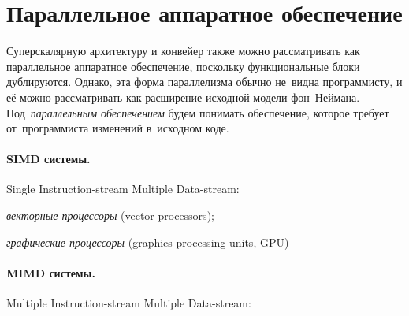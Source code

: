 \section{Параллельное аппаратное обеспечение}
Суперскалярную архитектуру и конвейер также можно рассматривать как параллельное аппаратное обеспечение, поскольку функциональные блоки дублируются. Однако, эта форма параллелизма обычно не~видна программисту, и её можно рассматривать как расширение исходной модели фон~Неймана. Под~\emph{параллельным обеспечением} будем понимать обеспечение, которое требует от~программиста изменений в~исходном коде.



\paragraph{SIMD системы.}
\textenglish{Single Instruction-stream Multiple Data-stream}:
\begin{itemfeature}
  \item \emph{векторные процессоры} (\textenglish{vector processors});
  \item \emph{графические процессоры} (\textenglish{graphics processing units, GPU})
\end{itemfeature}



\paragraph{MIMD системы.}
\textenglish{Multiple Instruction-stream Multiple Data-stream}:

